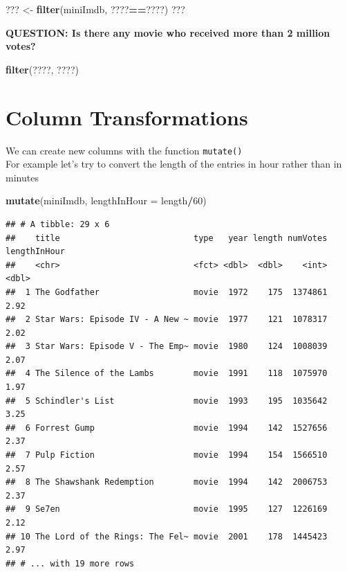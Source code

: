\documentclass[]{book}
\newenvironment{Shaded}{\begin{snugshade}}{\end{snugshade}}
\newcommand{\DataTypeTok}[1]{\textcolor[rgb]{0.13,0.29,0.53}{#1}}
\newcommand{\DecValTok}[1]{\textcolor[rgb]{0.00,0.00,0.81}{#1}}
\newcommand{\KeywordTok}[1]{\textcolor[rgb]{0.13,0.29,0.53}{\textbf{#1}}}
\newcommand{\NormalTok}[1]{#1}
\newcommand{\OperatorTok}[1]{\textcolor[rgb]{0.81,0.36,0.00}{\textbf{#1}}}
\newcommand{\StringTok}[1]{\textcolor[rgb]{0.31,0.60,0.02}{#1}}
\begin{document}
\begin{Shaded}
\begin{Highlighting}[]
\NormalTok{??? <-}\StringTok{ }\KeywordTok{filter}\NormalTok{(miniImdb, ????}\OperatorTok{==}\NormalTok{????)}
\NormalTok{???}
\end{Highlighting}
\end{Shaded}

\textbf{QUESTION: Is there any movie who received more than 2 million votes?}

\begin{Shaded}
\begin{Highlighting}[]
\KeywordTok{filter}\NormalTok{(????, ????)}
\end{Highlighting}
\end{Shaded}

\hypertarget{column-transformations}{%
\section{Column Transformations}\label{column-transformations}}

We can create new columns with the function \texttt{mutate()}\\
For example let's try to convert the length of the entries in hour rather than in minutes

\begin{Shaded}
\begin{Highlighting}[]
\KeywordTok{mutate}\NormalTok{(miniImdb, }\DataTypeTok{lengthInHour =}\NormalTok{ length}\OperatorTok{/}\DecValTok{60}\NormalTok{)}
\end{Highlighting}
\end{Shaded}

\begin{verbatim}
## # A tibble: 29 x 6
##    title                           type   year length numVotes lengthInHour
##    <chr>                           <fct> <dbl>  <dbl>    <int>        <dbl>
##  1 The Godfather                   movie  1972    175  1374861         2.92
##  2 Star Wars: Episode IV - A New ~ movie  1977    121  1078317         2.02
##  3 Star Wars: Episode V - The Emp~ movie  1980    124  1008039         2.07
##  4 The Silence of the Lambs        movie  1991    118  1075970         1.97
##  5 Schindler's List                movie  1993    195  1035642         3.25
##  6 Forrest Gump                    movie  1994    142  1527656         2.37
##  7 Pulp Fiction                    movie  1994    154  1566510         2.57
##  8 The Shawshank Redemption        movie  1994    142  2006753         2.37
##  9 Se7en                           movie  1995    127  1226169         2.12
## 10 The Lord of the Rings: The Fel~ movie  2001    178  1445423         2.97
## # ... with 19 more rows
\end{verbatim}
\end{document}
